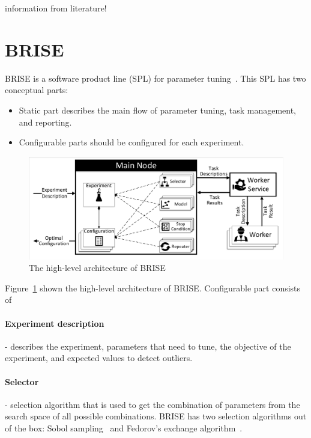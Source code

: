 information from literature!

\section{BRISE}\label{sec:BRISE}

BRISE is a software product line (SPL) for parameter tuning~\cite{pukhkaiev19}.
This SPL has two conceptual parts:

\begin{itemize}
	\item Static part describes the main flow of parameter tuning, task management, and reporting.
	\item Configurable parts should be configured for each experiment.
\end{itemize}

\begin{figure}
	\centering
	\includegraphics[width=\textwidth]{images/BRISEarch.pdf}
	\caption[The high-level architecture of BRISE]{The high-level architecture of BRISE}
	\label{fig:BRISEarch}
\end{figure}

Figure~\ref{fig:BRISEarch} shown the high-level architecture of BRISE.
Configurable part consists of 
\paragraph{Experiment description} - describes the experiment, parameters that need to tune, the objective of the experiment, and expected values to detect outliers.
\paragraph{Selector} - selection algorithm that is used to get the combination of parameters from the search space of all possible combinations. BRISE has two selection algorithms out of the box: Sobol sampling~\cite{sobol99} and Fedorov's exchange algorithm~\cite{fedorov13}. 
